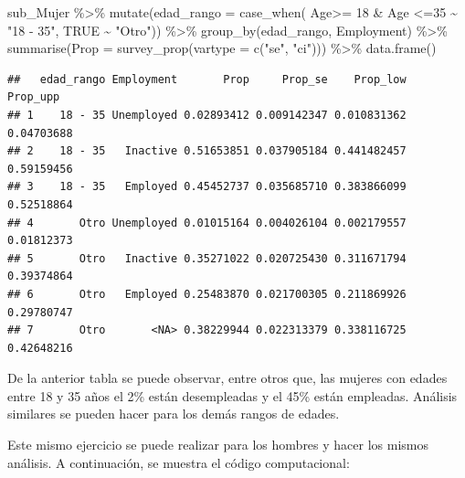 \documentclass[
  12pt,
]{book}
\newenvironment{Shaded}{\begin{snugshade}}{\end{snugshade}}
\newcommand{\AttributeTok}[1]{\textcolor[rgb]{0.77,0.63,0.00}{#1}}
\newcommand{\ConstantTok}[1]{\textcolor[rgb]{0.00,0.00,0.00}{#1}}
\newcommand{\DecValTok}[1]{\textcolor[rgb]{0.00,0.00,0.81}{#1}}
\newcommand{\FunctionTok}[1]{\textcolor[rgb]{0.00,0.00,0.00}{#1}}
\newcommand{\NormalTok}[1]{#1}
\newcommand{\SpecialCharTok}[1]{\textcolor[rgb]{0.00,0.00,0.00}{#1}}
\newcommand{\StringTok}[1]{\textcolor[rgb]{0.31,0.60,0.02}{#1}}
\begin{document}
\begin{Shaded}
\begin{Highlighting}[]
\NormalTok{sub\_Mujer }\SpecialCharTok{\%\textgreater{}\%} \FunctionTok{mutate}\NormalTok{(}\AttributeTok{edad\_rango =} \FunctionTok{case\_when}\NormalTok{(}
\NormalTok{                     Age}\SpecialCharTok{\textgreater{}=} \DecValTok{18} \SpecialCharTok{\&}\NormalTok{ Age }\SpecialCharTok{\textless{}=}\DecValTok{35}  \SpecialCharTok{\textasciitilde{}} \StringTok{"18 {-} 35"}\NormalTok{, }\ConstantTok{TRUE} \SpecialCharTok{\textasciitilde{}} \StringTok{"Otro"}\NormalTok{)) }\SpecialCharTok{\%\textgreater{}\%}
                     \FunctionTok{group\_by}\NormalTok{(edad\_rango, Employment) }\SpecialCharTok{\%\textgreater{}\%} 
                     \FunctionTok{summarise}\NormalTok{(}\AttributeTok{Prop =} \FunctionTok{survey\_prop}\NormalTok{(}\AttributeTok{vartype =}  \FunctionTok{c}\NormalTok{(}\StringTok{"se"}\NormalTok{, }\StringTok{"ci"}\NormalTok{))) }\SpecialCharTok{\%\textgreater{}\%} 
                     \FunctionTok{data.frame}\NormalTok{()}
\end{Highlighting}
\end{Shaded}

\begin{verbatim}
##   edad_rango Employment       Prop     Prop_se    Prop_low   Prop_upp
## 1    18 - 35 Unemployed 0.02893412 0.009142347 0.010831362 0.04703688
## 2    18 - 35   Inactive 0.51653851 0.037905184 0.441482457 0.59159456
## 3    18 - 35   Employed 0.45452737 0.035685710 0.383866099 0.52518864
## 4       Otro Unemployed 0.01015164 0.004026104 0.002179557 0.01812373
## 5       Otro   Inactive 0.35271022 0.020725430 0.311671794 0.39374864
## 6       Otro   Employed 0.25483870 0.021700305 0.211869926 0.29780747
## 7       Otro       <NA> 0.38229944 0.022313379 0.338116725 0.42648216
\end{verbatim}

De la anterior tabla se puede observar, entre otros que, las mujeres con edades entre 18 y 35 años el 2\% están desempleadas y el 45\% están empleadas. Análisis similares se pueden hacer para los demás rangos de edades.

Este mismo ejercicio se puede realizar para los hombres y hacer los mismos análisis. A continuación, se muestra el código computacional:
\end{document}
